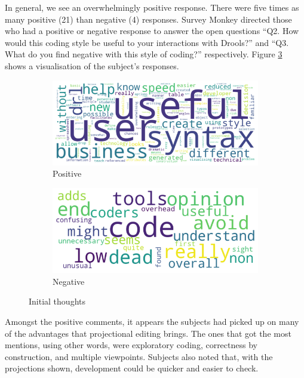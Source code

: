 In general, we see an overwhelmingly positive response.
There were five times as many positive (21) than negative (4) responses.
Survey Monkey directed those who had a positive or negative response to answer the open questions ``Q2. How would this coding style be useful to your interactions with Drools?'' and ``Q3. What do you find negative with this style of coding?'' respectively.
Figure \ref{fig:wordclouds} shows a visualisation of the subject's responses.

\begin{figure}[H]
    \begin{subfigure}{.60\textwidth}
      \centering
      \includegraphics[width=.95\linewidth]{Sections/images/positive_wordcloud.png}
      \caption{Positive}
      \label{fig:wfig1}
    \end{subfigure}%
    \begin{subfigure}{.40\textwidth}
      \centering
      \includegraphics[width=.95\linewidth]{Sections/images/negative_wordcloud.png}
      \caption{Negative}
      \label{fig:wfig2}
    \end{subfigure}
    \caption{Initial thoughts}
    \label{fig:wordclouds}
\end{figure}

Amongst the positive comments, it appears the subjects had picked up on many of the advantages that projectional editing brings.
The ones that got the most mentions, using other words, were exploratory coding, correctness by construction, and multiple viewpoints.
Subjects also noted that, with the projections shown, development could be quicker and easier to check.

